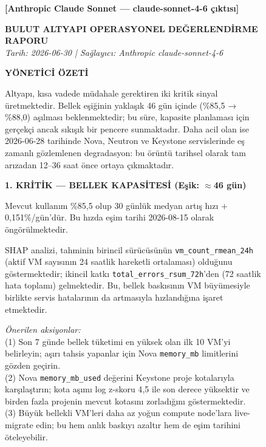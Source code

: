 \begin{figure}[htbp]
    \centering
    \begin{minipage}{0.96\textwidth}
    \small
    \ttfamily
    \setlength{\parindent}{0pt}
    \setlength{\parskip}{4pt}

    \textbf{[Anthropic Claude Sonnet — claude-sonnet-4-6 çıktısı]}

    \medskip

    \textbf{BULUT ALTYAPI OPERASYONEL DEĞERLENDİRME RAPORU}\\
    \textit{Tarih: 2026-06-30 | Sağlayıcı: Anthropic claude-sonnet-4-6}

    \medskip

    \textbf{YÖNETİCİ ÖZETİ}

    Altyapı, kısa vadede müdahale gerektiren iki kritik sinyal üretmektedir.
    Bellek eşiğinin yaklaşık 46 gün içinde (\%85{,}5 → \%88{,}0) aşılması beklenmektedir; bu süre, kapasite planlaması için gerçekçi ancak sıkışık bir pencere sunmaktadır.
    Daha acil olan ise 2026-06-28 tarihinde Nova, Neutron ve Keystone servislerinde eş zamanlı gözlemlenen degradasyon: bu örüntü tarihsel olarak tam arızadan 12--36 saat önce ortaya çıkmaktadır.

    \medskip

    \textbf{1. KRİTİK — BELLEK KAPASİTESİ (Eşik: $\approx$46 gün)}

    Mevcut kullanım \%85{,}5 olup 30 günlük medyan artış hızı $+$0{,}151\%/gün'dür.
    Bu hızda eşim tarihi 2026-08-15 olarak öngörülmektedir.

    SHAP analizi, tahminin birincil sürücüsünün \texttt{vm\_count\_rmean\_24h} (aktif VM sayısının 24 saatlik hareketli ortalaması) olduğunu göstermektedir; ikincil katkı \texttt{total\_errors\_rsum\_72h}'den (72 saatlik hata toplamı) gelmektedir.
    Bu, bellek baskısının VM büyümesiyle birlikte servis hatalarının da artmasıyla hızlandığına işaret etmektedir.

    \textit{Önerilen aksiyonlar:}\\
    (1) Son 7 günde bellek tüketimi en yüksek olan ilk 10 VM'yi belirleyin; aşırı tahsis yapanlar için Nova \texttt{memory\_mb} limitlerini gözden geçirin.\\
    (2) Nova \texttt{memory\_mb\_used} değerini Keystone proje kotalarıyla karşılaştırın; kota aşımı log z-skoru 4{,}5 ile son derece yüksektir ve birden fazla projenin mevcut kotasını zorladığını göstermektedir.\\
    (3) Büyük bellekli VM'leri daha az yoğun compute node'lara live-migrate edin; bu hem anlık baskıyı azaltır hem de eşim tarihini öteleyebilir.


\end{minipage}
\end{figure}

